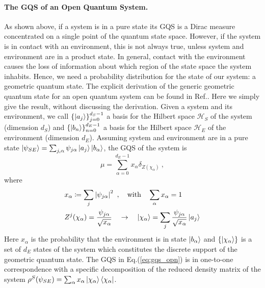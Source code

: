 \documentclass[draft,nofootinbib,pre,twocolumn,showpacs,showkeys,preprintnumbers,floatfix]{revtex4-1}
\newcommand{\1}{\mathbbm{1}}
\begin{document}
\paragraph*{The GQS of an Open Quantum System.}
As shown above, if a system is in a pure state its GQS is a Dirac measure concentrated
on a single point of the quantum state space. However, if the system is in contact with an environment, 
this is not always true, unless system and environment are in a product state. In general, contact with 
the environment causes the loss of information about which region of the state space the system inhabits. 
Hence, we need a probability distribution for the state of our system: a geometric quantum state. The explicit 
derivation of the generic geometric quantum state for an open quantum system can be found 
in Ref.\cite{Anza20a}. Here we simply give the result, without discussing the derivation. 
Given a system and its environment, we call $\left\{ \ket{a_j}\right\}_{j=0}^{d_S-1}$ a basis for 
the Hilbert space $\mathcal{H}_S$ of the system (dimension $d_S$) and 
$\left\{ \ket{b_n}\right\}_{n=0}^{d_E-1}$ a basis for the Hilbert space $\mathcal{H}_E$ 
of the environment (dimension $d_E$). Assuming system and environment are in 
a pure state $\ket{\psi_{SE}} = \sum_{j,\alpha}\psi_{j\alpha}\ket{a_j}\ket{b_\alpha}$, the 
GQS of the system is
\begin{equation}
\mu = \sum_{\alpha=0}^{d_E-1} x_\alpha \delta_{Z(\chi_\alpha)}~,\label{eq:gqs_opn}
\end{equation}
where 
\begin{subequations}\label{eq:def_xchi}
\begin{align}
&x_\alpha \coloneqq \sum_j \left\vert \psi_{j\alpha}\right\vert^2~, \quad \mathrm{with} \quad \sum_\alpha x_\alpha =1\\
&Z^j(\chi_\alpha) = \frac{\psi_{j\alpha}}{\sqrt{x_\alpha}}\quad \to \quad \ket{\chi_\alpha} = \sum_j \frac{\psi_{j\alpha}}{\sqrt{x_\alpha}}\ket{a_j}
\end{align}\label{eq:xgammas}
\end{subequations}
Here $x_\alpha$ is the probability that the environment is in state $\ket{b_\alpha}$ and $\left\{\ket{\chi_\alpha}\right\}$ 
is a set of $d_E$ states of the system which constitutes the discrete support of the geometric 
quantum state. The GQS in Eq.(\ref{eq:gqs_opn}) is in one-to-one correspondence with a specific decomposition
of the reduced density matrix of the system
$\rho^{S}(\psi_{SE}) = \sum_\alpha x_\alpha \ket{\chi_\alpha}\bra{\chi_\alpha}$.
\end{document}
